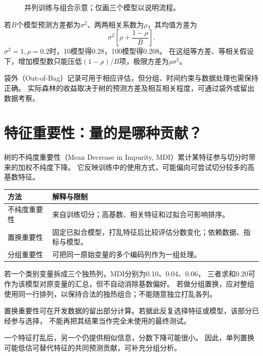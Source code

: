 \begin{figure}[htbp]
\centering
\caption{并列训练与组合示意；仅画三个模型以说明流程。}
\par\smallskip
{}
\end{figure}

若$B$个模型预测方差都为$\sigma^2$、两两相关系数为$\rho$，其均值方差为
\[
 \sigma^2\left[\rho+\frac{1-\rho}{B}\right].
\]
$\sigma^2=1,\rho=0.2$时，10模型得0.28，100模型得0.208。
在这组等方差、等相关假设下，增加模型数只能压低$(1-\rho)/B$项，极限方差为$\rho\sigma^2$。

袋外（Out-of-Bag）记录可用于相应评估，但分组、时间约束与数据处理也需保持正确。
实际森林的收益取决于树的预测方差及相互相关程度，可通过袋外或留出数据考察。



\section{特征重要性：量的是哪种贡献？}
\label{sec:tree-importance}
树的不纯度重要性（Mean Decrease in Impurity, MDI）累计某特征参与切分时带来的加权不纯度下降。
它反映训练中的使用方式，可能偏向可尝试切分较多的高基数特征。

\begin{center}
\begin{tabularx}{\textwidth}{P{35mm}Y}
\toprule
方法 & 解释与限制\\
\midrule
不纯度重要性 & 来自训练切分；高基数、相关特征和过拟合可影响排序。\\
置换重要性 & 固定已拟合模型，打乱特征后比较评估分数变化；依赖数据、指标与模型。\\
分组重要性 & 可把同一原始变量的多个编码列作为一组处理。\\
\bottomrule
\end{tabularx}
\end{center}

若一个类别变量拆成三个独热列，MDI分别为0.10、0.04、0.06，
三者求和0.20可作为该模型对原变量的汇总，但不自动消除基数偏好。
若做分组置换，应对整组使用同一行排列，以保持合法的独热组合；不能随意独立打乱各列。

置换重要性可在开发数据的留出部分计算。若据此反复选择特征或模型，该部分已经参与选择，
不能再把其结果当作完全未使用的最终测试。

\begin{pitfall}[相关特征可能掩盖彼此的重要性]
一个特征打乱后，另一个仍提供相似信息，分数下降可能很小。
因此，单列置换可能低估可替代特征的共同预测贡献，可补充分组分析。
\end{pitfall}

